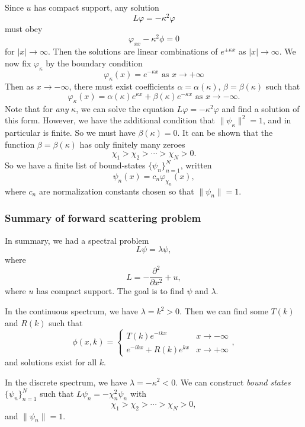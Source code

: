 \documentclass[a4paper]{article}
\begin{document}
Since $u$ has compact support, any solution
\[
  L \varphi = - \kappa^2 \varphi
\]
must obey
\[
  \varphi_{xx} - \kappa^2 \phi = 0
\]
for $|x| \to \infty$. Then the solutions are linear combinations of $e^{\pm \kappa x}$ as $|x| \to \infty$. We now fix $\varphi_\kappa$ by the boundary condition
\[
  \varphi_\kappa(x) = e^{-\kappa x} \text{ as } x \to +\infty
\]
Then as $x \to -\infty$, there must exist coefficients $\alpha = \alpha(\kappa)$, $\beta = \beta(\kappa)$ such that
\[
  \varphi_\kappa(x) = \alpha(\kappa) e^{\kappa x} + \beta(\kappa) e^{-\kappa x}\text{ as }x \to -\infty.
\]
Note that for \emph{any} $\kappa$, we can solve the equation $L \varphi = - \kappa^2 \varphi$ and find a solution of this form. However, we have the additional condition that $\|\psi_\kappa\|^2 = 1$, and in particular is finite. So we must have $\beta(\kappa) = 0$. It can be shown that the function $\beta = \beta(\kappa)$ has only finitely many zeroes
\[
  \chi_1 > \chi_2 > \cdots > \chi_N > 0.
\]
So we have a finite list of bound-states $\{\psi_n\}_{n= 1}^N$, written
\[
  \psi_n(x) = c_n \varphi_{\chi_n}(x),
\]
where $c_n$ are normalization constants chosen so that $\|\psi_n\| = 1$.

\subsubsection{Summary of forward scattering problem}
In summary, we had a spectral problem
\[
  L\psi = \lambda \psi,
\]
where
\[
  L = -\frac{\partial^2}{\partial x^2} + u,
\]
where $u$ has compact support. The goal is to find $\psi$ and $\lambda$.

In the continuous spectrum, we have $\lambda = k^2 > 0$. Then we can find some $T(k)$ and $R(k)$ such that
\[
  \phi(x, k) =
  \begin{cases}
    T(k) e^{-ikx} & x \to -\infty\\
    e^{-ikx} + R(k) e^{kx} & x \to +\infty
  \end{cases},
\]
and solutions exist for all $k$.

In the discrete spectrum, we have $\lambda = - \kappa^2 < 0$. We can construct \emph{bound states} $\{\psi_n\}_{n = 1}^N$ such that $L\psi_n = - \chi_n^2 \psi_n$ with
\[
  \chi_1 > \chi_2 > \cdots > \chi_N > 0,
\]
and $\|\psi_n\| = 1$.
\end{document}
